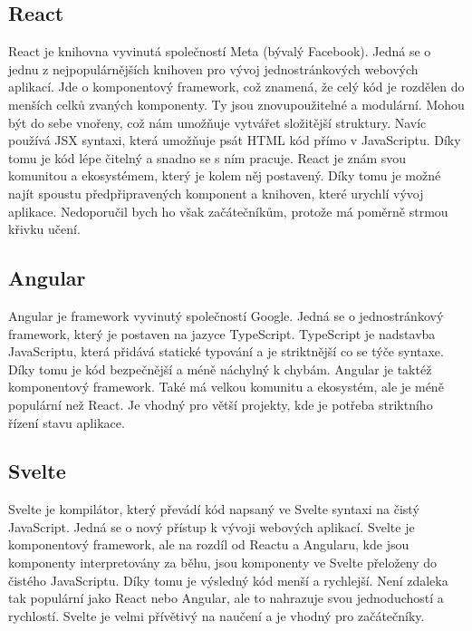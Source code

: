 \subsection*{React}
\label{subsec:react}

React je knihovna vyvinutá společností Meta (bývalý Facebook). Jedná se o jednu z nejpopulárnějších knihoven pro vývoj jednostránkových webových aplikací. Jde o komponentový framework, což znamená, že celý kód je rozdělen do menších celků zvaných komponenty. Ty jsou znovupoužitelné a modulární. Mohou být do sebe vnořeny, což nám umožňuje vytvářet složitější struktury. Navíc používá JSX syntaxi, která umožňuje psát HTML kód přímo v JavaScriptu. Díky tomu je kód lépe čitelný a snadno se s ním pracuje. React je znám svou komunitou a ekosystémem, který je kolem něj postavený. Díky tomu je možné najít spoustu předpřipravených komponent a knihoven, které urychlí vývoj aplikace. Nedoporučil bych ho však začátečníkům, protože má poměrně strmou křivku učení.

\subsection*{Angular}
\label{subsec:angular}

Angular je framework vyvinutý společností Google. Jedná se o jednostránkový framework, který je postaven na jazyce TypeScript. TypeScript je nadstavba JavaScriptu, která přidává statické typování a je striktnější co se týče syntaxe. Díky tomu je kód bezpečnější a méně náchylný k chybám. Angular je taktéž komponentový framework. Také má velkou komunitu a ekosystém, ale je méně populární než React. Je vhodný pro větší projekty, kde je potřeba striktního řízení stavu aplikace.

\subsection*{Svelte}
\label{subsec:svelte}

Svelte je kompilátor, který převádí kód napsaný ve Svelte syntaxi na čistý JavaScript. Jedná se o nový přístup k vývoji webových aplikací. Svelte je komponentový framework, ale na rozdíl od Reactu a Angularu, kde jsou komponenty interpretovány za běhu, jsou komponenty ve Svelte přeloženy do čistého JavaScriptu. Díky tomu je výsledný kód menší a rychlejší. Není zdaleka tak populární jako React nebo Angular, ale to nahrazuje svou jednoduchostí a rychlostí. Svelte je velmi přívětivý na naučení a je vhodný pro začátečníky.

